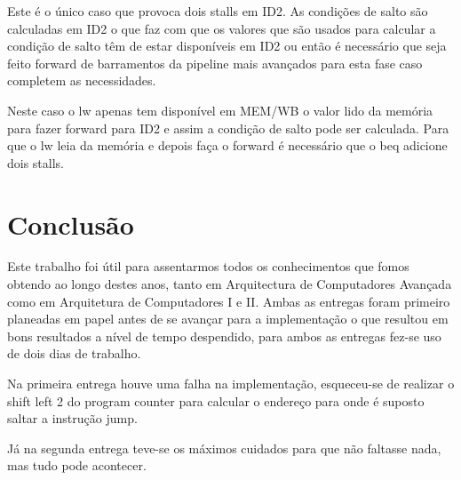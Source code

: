 \documentclass[pdftex,12pt,a4paper]{report}
\begin{document}
Este é o único caso que provoca dois stalls em ID2. As condições de salto são calculadas em ID2 o que faz com que os valores que são usados para calcular a condição de salto têm de estar disponíveis em ID2 ou então é necessário que seja feito forward de barramentos da pipeline mais avançados para esta fase caso completem as necessidades. 

Neste caso o lw apenas tem disponível em MEM/WB o valor lido da memória para fazer forward para ID2 e assim a condição de salto pode ser calculada. Para que o lw leia da memória e depois faça o forward é necessário que o beq adicione dois stalls.

\newpage
\section{Conclusão}

Este trabalho foi útil para assentarmos todos os conhecimentos que fomos obtendo ao longo destes anos, tanto em Arquitectura de Computadores Avançada como em Arquitetura de Computadores I e II. Ambas as entregas foram primeiro planeadas em papel antes de se avançar para a implementação o que resultou em bons resultados a nível de tempo despendido, para ambos as entregas fez-se uso de dois dias de trabalho.

Na primeira entrega houve uma falha na implementação, esqueceu-se de realizar o shift left 2 do program counter para calcular o endereço para onde é suposto saltar a instrução jump.

Já na segunda entrega teve-se os máximos cuidados para que não faltasse nada, mas tudo pode acontecer.
\end{document}
